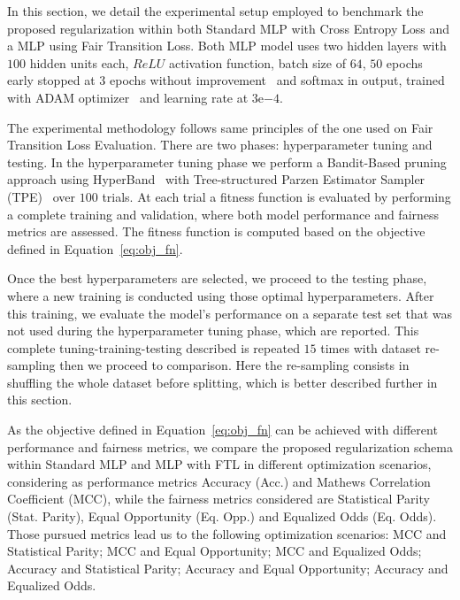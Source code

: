 In this section, we detail the experimental setup employed to benchmark the proposed regularization within both Standard MLP with Cross Entropy Loss and a MLP using Fair Transition Loss. Both MLP model uses two hidden layers with $100$ hidden units each, $ReLU$ activation function, batch size of $64$, $50$ epochs early stopped at $3$ epochs without improvement~\citep{Li2020} and softmax in output, trained with ADAM optimizer~\citep{KingmaB14} and learning rate at $3\mathrm{e}{-4}$. 

The experimental methodology follows same principles of the one used on Fair Transition Loss Evaluation. There are two phases: hyperparameter tuning and testing. In the hyperparameter tuning phase we perform a Bandit-Based pruning approach using HyperBand~\citep{Li2018} with Tree-structured Parzen Estimator Sampler (TPE)~\citep{bergstra2011} over $100$ trials. At each trial a fitness function is evaluated by performing a complete training and validation, where both model performance and fairness metrics are assessed. The fitness function is computed based on the objective defined in Equation~\ref{eq:obj_fn}. 

Once the best hyperparameters are selected, we proceed to the testing phase, where a new training is conducted using those optimal hyperparameters. After this training, we evaluate the model's performance on a separate test set that was not used during the hyperparameter tuning phase, which are reported. This complete tuning-training-testing described is repeated $15$ times with dataset re-sampling then we proceed to comparison. Here the re-sampling consists in shuffling the whole dataset before splitting, which is better described further in this section.

As the objective defined in Equation~\ref{eq:obj_fn} can be achieved with different performance and fairness metrics, we compare the proposed regularization schema within Standard MLP and MLP with FTL in different optimization scenarios, considering as performance metrics Accuracy (Acc.) and Mathews Correlation Coefficient (MCC), while the fairness metrics considered are Statistical Parity (Stat. Parity), Equal Opportunity (Eq. Opp.) and Equalized Odds (Eq. Odds). Those pursued metrics lead us to the following optimization scenarios: MCC and Statistical Parity; MCC and Equal Opportunity; MCC and Equalized Odds; Accuracy and Statistical Parity; Accuracy and Equal Opportunity; Accuracy and Equalized Odds.

